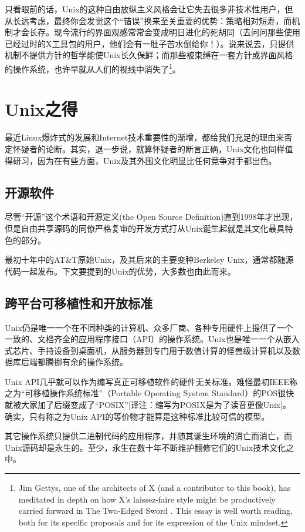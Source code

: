 \documentclass[12pt,oneside]{book}
\begin{document}
只看眼前的话，Unix的这种自由放纵主义风格会让它失去很多非技术性用户，但从长远考虑，最终你会发觉这个“错误”换来至关重要的优势：策略相对短寿，而机制才会长存。现今流行的界面观感常常会变成明日进化的死胡同（去问问那些使用已经过时的X工具包的用户，他们会有一肚子苦水倒给你！）。说来说去，只提供机制不提供方针的哲学能使Unix长久保鲜；而那些被束缚在一套方针或界面风格的操作系统，也许早就从人们的视线中消失了\footnote{Jim Gettys, one of the architects of X (and a contributor to this book), has meditated in depth on how X's laissez-faire style might be productively carried forward in The Two-Edged Sword \cite{Gettys}. This essay is well worth reading, both for its specific proposals and for its expression of the Unix mindset.}。


\section{Unix之得}
最近Linux爆炸式的发展和Internet技术重要性的渐增，都给我们充足的理由来否定怀疑者的论断。其实，退一步说，就算怀疑者的断言正确，Unix文化也同样值得研习，因为在有些方面，Unix及其外围文化明显比任何竞争对手都出色。

\subsection{开源软件}
尽管“开源”这个术语和开源定义(the Open Source Definition)直到1998年才出现，但是自由共享源码的同僚严格复审的开发方式打从Unix诞生起就是其文化最具特色的部分。

最初十年中的AT\&{}T原始Unix，及其后来的主要变种Berkeley Unix，通常都随源代码一起发布。下文要提到的Unix的优势，大多数也由此而来。

\subsection{跨平台可移植性和开放标准}
Unix仍是唯一一个在不同种类的计算机、众多厂商、各种专用硬件上提供了一个一致的、文档齐全的应用程序接口（API）的操作系统。Unix也是唯一一个从嵌入式芯片、手持设备到桌面机，从服务器到专门用于数值计算的怪兽级计算机以及数据库后端都腾挪有余的操作系统。

Unix API几乎就可以作为编写真正可移植软件的硬件无关标准。难怪最初IEEE称之为“可移植操作系统标准”（Portable Operating System Standard）的POS很快就被大家加了后缀变成了“POSIX”[译注：缩写为POSIX是为了读音更像Unix]。  确实，只有称之为Unix API的等价物才能算是这种标准比较可信的模型。

其它操作系统只提供二进制代码的应用程序，并随其诞生环境的消亡而消亡，而Unix源码却是永生的。至少，永生在数十年不断维护翻修它们的Unix技术文化之中。
\end{document}
